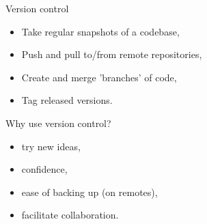 \documentclass{beamer} %
\begin{document}
\begin{frame}[label=GIT]{Version control}
  \pause
  \begin{itemize}
    \item Take regular snapshots of a codebase,
    \item Push and pull to/from remote repositories,
    \item Create and merge 'branches' of code,
    \item Tag released versions.
  \end{itemize}
  
\end{frame}

  \begin{frame}[label=GIT]{Why use version control?}
    \pause
    \begin{itemize}
      \item try new ideas,
      \item confidence,
      \item ease of backing up (on remotes),
      \item facilitate collaboration.
    \end{itemize}
    
  \end{frame}
\end{document}
